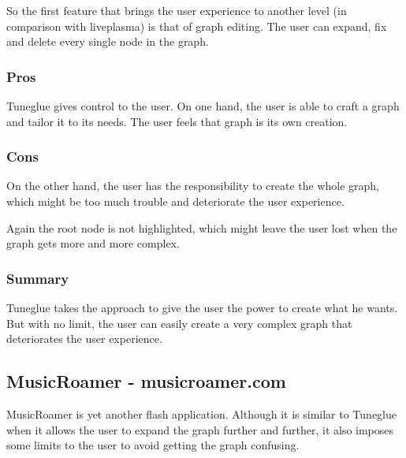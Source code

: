 So the first feature that brings the user experience to another level (in comparison with liveplasma) is that of graph editing.
The user can expand, fix and delete every single node in the graph.


\subsubsection{Pros} %
\label{ssub:audiomap_pros}

Tuneglue gives control to the user.
On one hand, the user is able to craft a graph and tailor it to its needs.
The user feels that graph is its own creation.


\subsubsection{Cons} %
\label{ssub:audiomap_cons}

On the other hand, the user has the responsibility to create the whole graph, which might be too much trouble and deteriorate the user experience.

Again the root node is not highlighted, which might leave the user lost when the graph gets more and more complex.


\subsubsection{Summary} %
\label{ssub:audiomap_summary}

Tuneglue takes the approach to give the user the power to create what he wants.
But with no limit, the user can easily create a very complex graph that deteriorates the user experience.




\subsection{MusicRoamer - musicroamer.com} %
\label{sub:musicroamer}

  MusicRoamer is yet another flash application.
  Although it is similar to Tuneglue when it allows the user to expand the graph further and further, it also imposes some limits to the user to avoid getting the graph confusing.

